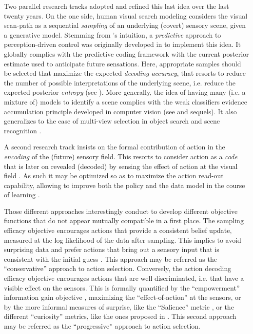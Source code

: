 \documentclass[12pt,twoside,openright]{article}
\begin{document}
Two parallel research tracks adopted and refined this last idea over the last twenty years.
On the one side, human visual search modeling considers the visual scan-path as a sequential \emph{sampling} of an underlying (covert) sensory scene, given a generative model. 
Stemming from \citep{bajcsy1988active}'s intuition, a \emph{predictive} approach to perception-driven control was originally developed in \citep{najemnik2005optimal} to implement this idea.
It globally complies with the predictive coding framework \citep{rao1999predictive} with the current posterior estimate used to anticipate future sensations. 
Here, appropriate samples should be selected that maximize the expected \emph{decoding accuracy}, that resorts to reduce the number of possible interpretations of the underlying scene, i.e. reduce the expected posterior \emph{entropy} (see \citet{najemnik2005optimal,najemnik2009simple,butko2010infomax,friston2012perceptions}).
More generally, the idea of having many (i.e. a mixture of) models to identify a scene complies with the weak classifiers evidence accumulation principle developed in computer vision (see \citet{viola2003fast} and sequels). It also generalizes to the case of multi-view selection in object search and scene recognition \citep{potthast2016active}.

A second research track insists on the formal contribution of action in the \emph{encoding} of the (future) sensory field. This resorts to consider action as a \emph{code} that is later on revealed (decoded) by sensing the effect of action at the visual field \citep{klyubin2005empowerment,tishby2011information}. As such it may be optimized so as to maximize the action read-out capability, allowing to improve both the policy and the data model in the course of learning \citep{schmidhuber2007simple,mohamed2015variational,houthooft2016vime}.


Those different approaches interestingly conduct to develop different objective functions that do not appear mutually compatible in a first place.
The sampling efficacy objective encourages actions that provide a consistent belief update, measured at the log likelihood of the data after sampling. This implies to avoid surprising data and prefer actions that bring out a sensory input that is consistent with the initial guess \citep{friston2010free}. This  approach may be referred as the ``conservative'' approach to action selection.  
Conversely,{ \color{Purple} the action decoding efficacy objective encourages actions that are well discriminated, i.e. that have a visible effect on the sensors. This is formally quantified by the ``empowerment'' information gain objective \citep{klyubin2005empowerment,tishby2011information}, maximizing the ``effect-of-action'' at the sensors, or by the more informal measures of surprise, like the ``Salience'' metric \citep{itti2005bayesian}, or the
different ``curiosity'' metrics, like the ones proposed in \citet{schmidhuber1991curious,oudeyer2008can, pathak2017curiosity}}. This second approach may be referred as the ``progressive'' approach to action selection. 
\end{document}
